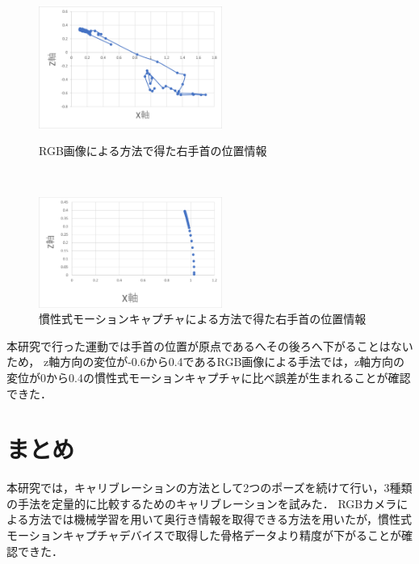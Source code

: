 \documentclass[titlepage]{jarticle}
\begin{document}
\begin{figure}[h]
  \centering
  \begin{minipage}{6cm}
    \centering
    \includegraphics[width=6cm]{img/1_media.png}
    \caption{RGB画像による方法で得た右手首の位置情報}
    \label{fig:1_media}
  \end{minipage}\\
  \begin{minipage}{6cm}
    \centering
    \includegraphics[width=6cm]{img/1_mocopi.png}
    \caption{慣性式モーションキャプチャによる方法で得た右手首の位置情報}
    \label{fig:1_mocopi}
  \end{minipage}
\end{figure}

本研究で行った運動では手首の位置が原点であるへその後ろへ下がることはないため，
z軸方向の変位が-0.6から0.4であるRGB画像による手法では，z軸方向の変位が0から0.4の慣性式モーションキャプチャに比べ誤差が生まれることが確認できた．

\section{まとめ}
本研究では，キャリブレーションの方法として2つのポーズを続けて行い，3種類の手法を定量的に比較するためのキャリブレーションを試みた．
RGBカメラによる方法では機械学習を用いて奥行き情報を取得できる方法を用いたが，慣性式モーションキャプチャデバイスで取得した骨格データより精度が下がることが確認できた．
\end{document}
